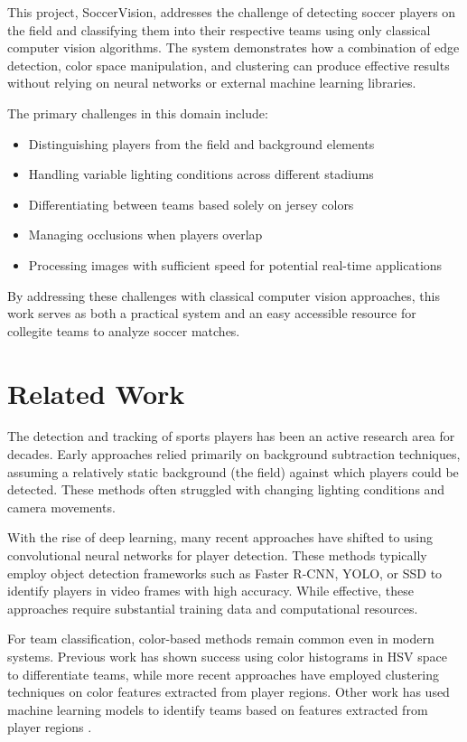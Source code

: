 \documentclass[10pt,twocolumn,letterpaper]{article}
\begin{document}
This project, SoccerVision, addresses the challenge of detecting soccer players on the field and classifying them into their respective teams using only classical computer vision algorithms. The system demonstrates how a combination of edge detection, color space manipulation, and clustering can produce effective results without relying on neural networks or external machine learning libraries.

The primary challenges in this domain include:
\begin{itemize}
    \item Distinguishing players from the field and background elements
    \item Handling variable lighting conditions across different stadiums
    \item Differentiating between teams based solely on jersey colors
    \item Managing occlusions when players overlap
    \item Processing images with sufficient speed for potential real-time applications
\end{itemize}

By addressing these challenges with classical computer vision approaches, this work serves as both a practical system and an easy accessible resource for collegite teams to analyze soccer matches.

\section{Related Work}
\label{sec:related}

The detection and tracking of sports players has been an active research area for decades. Early approaches relied primarily on background subtraction techniques, assuming a relatively static background (the field) against which players could be detected. These methods often struggled with changing lighting conditions and camera movements.

With the rise of deep learning, many recent approaches have shifted to using convolutional neural networks for player detection. These methods typically employ object detection frameworks such as Faster R-CNN, YOLO, or SSD to identify players in video frames with high accuracy. While effective, these approaches require substantial training data and computational resources.

For team classification, color-based methods remain common even in modern systems. Previous work has shown success using color histograms in HSV space to differentiate teams, while more recent approaches have employed clustering techniques on color features extracted from player regions. Other work has used machine learning models to identify teams based on features extracted from player regions \cite{SoccerCV2013}.
\end{document}
